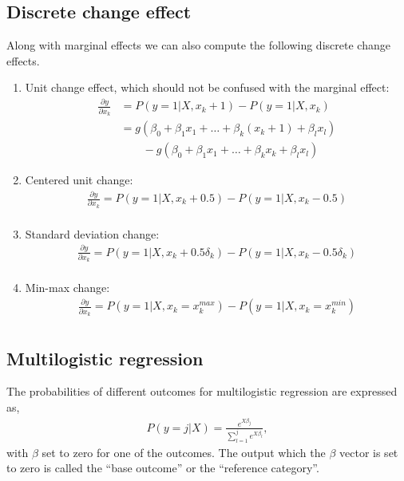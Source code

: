\subsection{Discrete change effect} %
\label{sub:discrete_change_effect}
Along with marginal effects we can also compute the following discrete change
effects.

\begin{enumerate}
  \item Unit change effect, which should not be confused with the
marginal effect:
\begin{align*}
   \frac{\partial y}{\partial x_k} & = P(y=1|X,x_k+1) - P(y=1|X, x_k) \\
                                     & = g(\beta_0 + \beta_1 x_1 + \dots  + \beta_k (x_k+1) + \beta_l x_l) \\
                                    & \qquad  - g(\beta_0 + \beta_1 x_1 + \dots  + \beta_k x_k + \beta_l x_l)
 \end{align*}
    \item Centered unit change:
        \begin{gather*}
          \frac{\partial y}{\partial x_k} = P(y=1|X,x_k+0.5) - P(y=1|X, x_k-0.5) \\
        \end{gather*}
    \item Standard deviation change:
        \begin{gather*}
          \frac{\partial y}{\partial x_k} = P(y=1|X,x_k+0.5\delta_k) - P(y=1|X, x_k-0.5\delta_k) \\
        \end{gather*}
    \item Min-max change:
        \begin{gather*}
          \frac{\partial y}{\partial x_k} = P(y=1|X,x_k=x_k^{max}) - P(y=1|X, x_k=x_k^{min}) \\
        \end{gather*}
\end{enumerate}

\subsection{Multilogistic regression} %
\label{sub:multilogistic_regression}
The probabilities of different outcomes for multilogistic regression are expressed as,
\begin{gather*}
  P(y=j | X)  = \frac{e^{X\beta_j}}{\sum_{l=1}^{j} e^{X\beta_l}},
\end{gather*}
with $\beta$ set to zero for one of the outcomes. The output which the
$\beta$ vector is set to zero is called the ``base outcome'' or the ``reference category''.

